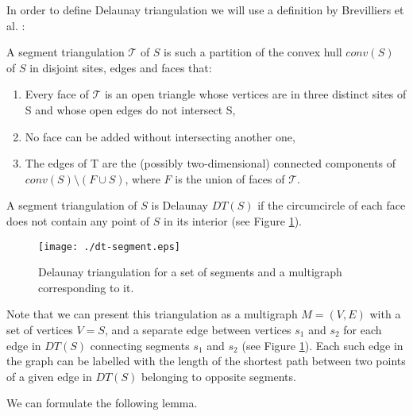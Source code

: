 \documentclass[11pt]{llncs}
\begin{document}
In order to define Delaunay triangulation we will use a definition by Brevilliers et al. \cite{bcs08}:
\begin{definition}
A segment triangulation $\mathcal{T}$ of $S$ is such a partition of the convex hull $conv(S)$ of $S$ 
in disjoint sites, edges and faces that: 
\begin{enumerate}
\item Every face of $\mathcal{T}$ is an open triangle whose vertices are in three distinct sites 
of S and whose open edges do not intersect S,
\item No face can be added without intersecting another one,
\item The edges of T are the (possibly two-dimensional) connected components of $conv(S)\setminus 
(F \cup S)$, where  $F$ is the union of faces of $\mathcal{T}$.
\end{enumerate} 
\end{definition}

A segment triangulation of $S$ is Delaunay $DT(S)$ if the circumcircle of each face does not contain 
any point of $S$ in its interior (see Figure \ref{fig:segments}). 

\begin{figure}[htbp]
\centering
\texttt{[image: ./dt-segment.eps]}
\caption{Delaunay triangulation for a set of segments and a multigraph corresponding to it.}
\label{fig:segments}
\end{figure}

Note that we can present this triangulation as a multigraph $M=(V,E)$ with a set of vertices $V=S$, 
and a separate edge between vertices $s_1$ and $s_2$ for each edge in $DT(S)$ connecting segments 
$s_1$ and $s_2$ (see Figure \ref{fig:segments}). Each such edge in the graph can be labelled with 
the length of the shortest path between two points of a given edge in $DT(S)$ belonging to opposite 
segments.

We can formulate the following lemma.
\end{document}
